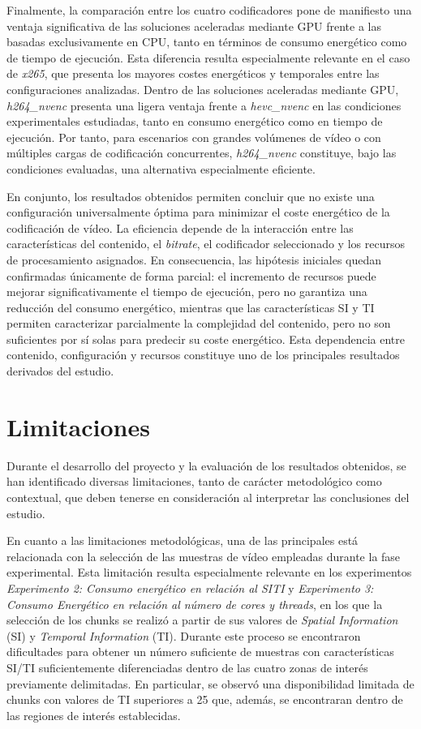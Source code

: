  Finalmente, la comparación entre los cuatro codificadores pone de manifiesto una ventaja significativa de las soluciones aceleradas mediante GPU frente a las basadas exclusivamente en CPU, tanto en términos de consumo energético como de tiempo de ejecución. Esta diferencia resulta especialmente relevante en el caso de \textit{x265}, que presenta los mayores costes energéticos y temporales entre las configuraciones analizadas. Dentro de las soluciones aceleradas mediante GPU, \textit{h264\_nvenc} presenta una ligera ventaja frente a \textit{hevc\_nvenc} en las condiciones experimentales estudiadas, tanto en consumo energético como en tiempo de ejecución. Por tanto, para escenarios con grandes volúmenes de vídeo o con múltiples cargas de codificación concurrentes, \textit{h264\_nvenc} constituye, bajo las condiciones evaluadas, una alternativa especialmente eficiente.

En conjunto, los resultados obtenidos permiten concluir que no existe una configuración universalmente óptima para minimizar el coste energético de la codificación de vídeo. La eficiencia depende de la interacción entre las características del contenido, el \textit{bitrate}, el codificador seleccionado y los recursos de procesamiento asignados. En consecuencia, las hipótesis iniciales quedan confirmadas únicamente de forma parcial: el incremento de recursos puede mejorar significativamente el tiempo de ejecución, pero no garantiza una reducción del consumo energético, mientras que las características SI y TI permiten caracterizar parcialmente la complejidad del contenido, pero no son suficientes por sí solas para predecir su coste energético. Esta dependencia entre contenido, configuración y recursos constituye uno de los principales resultados derivados del estudio.

\section{Limitaciones}

Durante el desarrollo del proyecto y la evaluación de los resultados obtenidos, se han identificado diversas limitaciones, tanto de carácter metodológico como contextual, que deben tenerse en consideración al interpretar las conclusiones del estudio.

En cuanto a las limitaciones metodológicas, una de las principales está relacionada con la selección de las muestras de vídeo empleadas durante la fase experimental. Esta limitación resulta especialmente relevante en los experimentos \textit{Experimento 2: Consumo energético en relación al SITI } y \textit{Experimento 3: Consumo Energético en relación al número de cores y threads}, en los que la selección de los chunks se realizó a partir de sus valores de \textit{Spatial Information} (SI) y \textit{Temporal Information} (TI). Durante este proceso se encontraron dificultades para obtener un número suficiente de muestras con características SI/TI suficientemente diferenciadas dentro de las cuatro zonas de interés previamente delimitadas. En particular, se observó una disponibilidad limitada de chunks con valores de TI superiores a 25 que, además, se encontraran dentro de las regiones de interés establecidas.

